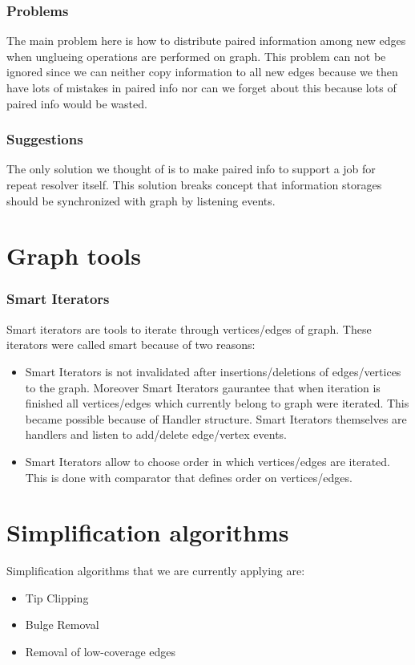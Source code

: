 \documentclass[12pt]{article}
\begin{document}
\subsubsection{Problems}

The main problem here is how to distribute paired information among new edges when unglueing operations are performed on graph. This problem can not be ignored since we can neither copy information to all new edges because we then have lots of mistakes in paired info nor can we forget about this because lots of paired info would be wasted.

\subsubsection{Suggestions}

The only solution we thought of is to make paired info to support a job for repeat resolver itself. This solution breaks concept that information storages should be synchronized with graph by listening events.

\section{Graph tools}
\subsubsection{Smart Iterators}

Smart iterators are tools to iterate through vertices/edges of graph. These iterators were called smart because of two reasons:
\begin{itemize}
\item Smart Iterators is not invalidated after insertions/deletions of edges/vertices to the graph. Moreover Smart Iterators gaurantee that when iteration is finished all vertices/edges which currently belong to graph were iterated. This became possible because of Handler structure. Smart Iterators themselves are handlers and listen to add/delete edge/vertex events.
\item Smart Iterators allow to choose order in which vertices/edges are iterated. This is done with comparator that defines order on vertices/edges.
\end{itemize}

\section{Simplification algorithms}
Simplification algorithms that we are currently applying are:
\begin{itemize}
\item Tip Clipping
\item Bulge Removal
\item Removal of low-coverage edges
\end{itemize}
\end{document}
